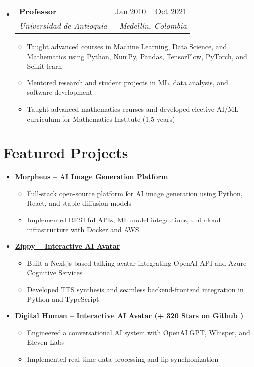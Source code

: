 \documentclass[letterpaper,11pt]{article}
\makeatletter
\newcommand{\resumeSubheading}[4]{
  \vspace{-2pt}
  \item[]
  \begin{tabular*}{\textwidth}{@{\extracolsep{\fill}}l r}
    \textbf{#1} & #2 \\
    \textit{#3} & \textit{#4} \\
  \end{tabular*}
  \vspace{-5pt}
}
\newcommand{\normalfaExternalLink}{{\mdseries\faExternalLink}}
\makeatother
\begin{document}
\begin{itemize}[leftmargin=0pt, itemindent=0pt, label={}]
\resumeSubheading
{Professor}{Jan 2010 -- Oct 2021}
{Universidad de Antioquia}{Medellín, Colombia}
\begin{itemize}[leftmargin=*]
    \item Taught advanced courses in Machine Learning, Data Science, and Mathematics using Python, NumPy, Pandas, TensorFlow, PyTorch, and Scikit-learn
    \item Mentored research and student projects in ML, data analysis, and software development
    \item Taught advanced mathematics courses and developed elective AI/ML curriculum for Mathematics Institute (1.5 years)
\end{itemize}
\end{itemize}

\section{Featured Projects}
\begin{itemize}[leftmargin=*]
    \item \textbf{\href{https://github.com/Monadical-SAS/Morpheus}{Morpheus -- AI Image Generation Platform \normalfaExternalLink}}
    \begin{itemize}
        \item Full-stack open-source platform for AI image generation using Python, React, and stable diffusion models
        \item Implemented RESTful APIs, ML model integrations, and cloud infrastructure with Docker and AWS
    \end{itemize}
    \item \textbf{\href{https://github.com/asanchezyali/ai-avatar}{Zippy -- Interactive AI Avatar \normalfaExternalLink}}
    \begin{itemize}
        \item Built a Next.js-based talking avatar integrating OpenAI API and Azure Cognitive Services
        \item Developed TTS synthesis and seamless backend-frontend integration in Python and TypeScript
    \end{itemize}
    \item \textbf{\href{https://github.com/asanchezyali/talking-avatar-with-ai}{Digital Human -- Interactive AI Avatar (+
        320 Stars on Github )\normalfaExternalLink}}
    \begin{itemize}
        \item Engineered a conversational AI system with OpenAI GPT, Whisper, and Eleven Labs
        \item Implemented real-time data processing and lip synchronization
    \end{itemize}
\end{itemize}
\end{document}
